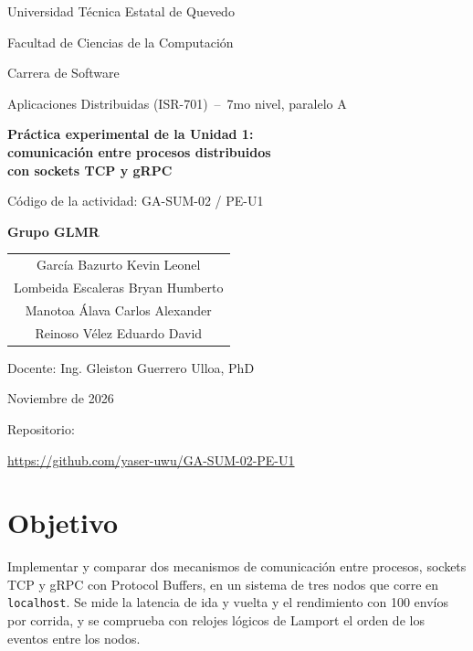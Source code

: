 \documentclass[11pt,a4paper]{article}
\begin{document}
\begin{titlepage}
  \centering
  {\large Universidad Técnica Estatal de Quevedo\par}
  {\large Facultad de Ciencias de la Computación\par}
  {\large Carrera de Software\par}
  \vspace{0.5cm}
  {\large Aplicaciones Distribuidas (ISR-701) \,--\, 7mo nivel, paralelo A\par}
  \vspace{2cm}
  {\LARGE\bfseries Práctica experimental de la Unidad 1:\\
  comunicación entre procesos distribuidos\\con sockets TCP y gRPC\par}
  \vspace{1.5cm}
  {\large Código de la actividad: GA-SUM-02 / PE-U1\par}
  \vspace{1.5cm}
  {\large\bfseries Grupo GLMR\par}
  \vspace{0.4cm}
  \begin{tabular}{c}
    García Bazurto Kevin Leonel \\
    Lombeida Escaleras Bryan Humberto \\
    Manotoa Álava Carlos Alexander \\
    Reinoso Vélez Eduardo David
  \end{tabular}
  \vspace{1.5cm}

  {\large Docente: Ing. Gleiston Guerrero Ulloa, PhD\par}
  \vspace{0.4cm}
  {\large Noviembre de 2026\par}
  \vspace{1.5cm}
  {\large Repositorio:\par}
  {\small\url{https://github.com/yaser-uwu/GA-SUM-02-PE-U1}\par}
\end{titlepage}

\section{Objetivo}

Implementar y comparar dos mecanismos de comunicación entre procesos, sockets TCP y
gRPC con Protocol Buffers, en un sistema de tres nodos que corre en \texttt{localhost}.
Se mide la latencia de ida y vuelta y el rendimiento con 100 envíos por corrida, y se
comprueba con relojes lógicos de Lamport el orden de los eventos entre los nodos.
\end{document}
